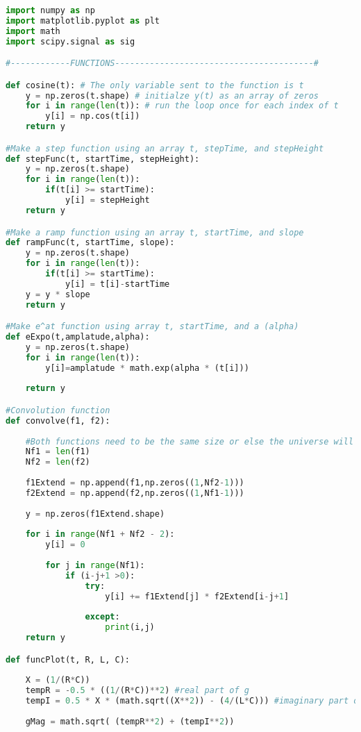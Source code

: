 \documentclass[12pt,a4paper]{article}
\begin{document}
\begin{lstlisting}[language=Python]
import numpy as np
import matplotlib.pyplot as plt
import math
import scipy.signal as sig

#------------FUNCTIONS----------------------------------------#

def cosine(t): # The only variable sent to the function is t
    y = np.zeros(t.shape) # initialze y(t) as an array of zeros
    for i in range(len(t)): # run the loop once for each index of t
        y[i] = np.cos(t[i])
    return y

#Make a step function using an array t, stepTime, and stepHeight
def stepFunc(t, startTime, stepHeight):
    y = np.zeros(t.shape)
    for i in range(len(t)):
        if(t[i] >= startTime):
            y[i] = stepHeight
    return y

#Make a ramp function using an array t, startTime, and slope
def rampFunc(t, startTime, slope):
    y = np.zeros(t.shape)
    for i in range(len(t)):
        if(t[i] >= startTime):
            y[i] = t[i]-startTime
    y = y * slope
    return y

#Make e^at function using array t, startTime, and a (alpha)
def eExpo(t,amplatude,alpha):
    y = np.zeros(t.shape)
    for i in range(len(t)):
        y[i]=amplatude * math.exp(alpha * (t[i]))
    
    return y

#Convolution function
def convolve(f1, f2):
    
    #Both functions need to be the same size or else the universe will explode!
    Nf1 = len(f1)
    Nf2 = len(f2)
    
    f1Extend = np.append(f1,np.zeros((1,Nf2-1)))
    f2Extend = np.append(f2,np.zeros((1,Nf1-1)))
    
    y = np.zeros(f1Extend.shape)
    
    for i in range(Nf1 + Nf2 - 2):
        y[i] = 0
        
        for j in range(Nf1):
            if (i-j+1 >0):
                try:
                    y[i] += f1Extend[j] * f2Extend[i-j+1]
                
                except:
                    print(i,j)
    return y

def funcPlot(t, R, L, C):
    
    X = (1/(R*C))
    tempR = -0.5 * ((1/(R*C))**2) #real part of g
    tempI = 0.5 * X * (math.sqrt((X**2)) - (4/(L*C))) #imaginary part of g
    
    gMag = math.sqrt( (tempR**2) + (tempI**2)) 
    

\end{lstlisting}
\end{document}
